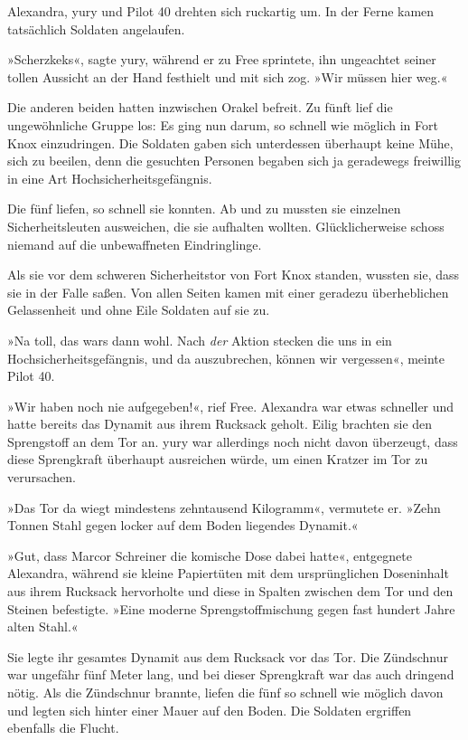 Alexandra, yury und Pilot 40 drehten sich ruckartig um. In der Ferne kamen tatsächlich Soldaten angelaufen.

»Scherzkeks«, sagte yury, während er zu Free sprintete, ihn ungeachtet seiner tollen Aussicht an der Hand festhielt und mit sich zog. »Wir müssen hier weg.«

Die anderen beiden hatten inzwischen Orakel befreit. Zu fünft lief die ungewöhnliche Gruppe los: Es ging nun darum, so schnell wie möglich in Fort Knox einzudringen. Die Soldaten gaben sich unterdessen überhaupt keine Mühe, sich zu beeilen, denn die gesuchten Personen begaben sich ja geradewegs freiwillig in eine Art Hochsicherheitsgefängnis.

Die fünf liefen, so schnell sie konnten. Ab und zu mussten sie einzelnen Sicherheitsleuten ausweichen, die sie aufhalten wollten. Glücklicherweise schoss niemand auf die unbewaffneten Eindringlinge.

Als sie vor dem schweren Sicherheitstor von Fort Knox standen, wussten sie, dass sie in der Falle saßen. Von allen Seiten kamen mit einer geradezu überheblichen Gelassenheit und ohne Eile Soldaten auf sie zu.

»Na toll, das wars dann wohl. Nach \emph{der} Aktion stecken die uns in ein Hochsicherheitsgefängnis, und da auszubrechen, können wir vergessen«, meinte Pilot 40.

»Wir haben noch nie aufgegeben!«, rief Free. Alexandra war etwas schneller und hatte bereits das Dynamit aus ihrem Rucksack geholt. Eilig brachten sie den Sprengstoff an dem Tor an. yury war allerdings noch nicht davon überzeugt, dass diese Sprengkraft überhaupt ausreichen würde, um einen Kratzer im Tor zu verursachen.

»Das Tor da wiegt mindestens zehntausend Kilogramm«, vermutete er. »Zehn Tonnen Stahl gegen locker auf dem Boden liegendes Dynamit.«

»Gut, dass Marcor Schreiner die komische Dose dabei hatte«, entgegnete Alexandra, während sie kleine Papiertüten mit dem ursprünglichen Doseninhalt aus ihrem Rucksack hervorholte und diese in Spalten zwischen dem Tor und den Steinen befestigte. »Eine moderne Sprengstoffmischung gegen fast hundert Jahre alten Stahl.«

Sie legte ihr gesamtes Dynamit aus dem Rucksack vor das Tor. Die Zündschnur war ungefähr fünf Meter lang, und bei dieser Sprengkraft war das auch dringend nötig. Als die Zündschnur brannte, liefen die fünf so schnell wie möglich davon und legten sich hinter einer Mauer auf den Boden. Die Soldaten ergriffen ebenfalls die Flucht.

